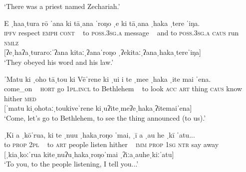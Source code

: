 \glt 
‘There was a priest named Zechariah.’ \textstyleExampleref{[R630-01.002]}
\z

\ea\label{ex:2.3}
\gll E ˌha{\ꞌ}aˌtura  rō ˈ{\ꞌ}ana {\textup{\textbar}} ki tāˌ{\ꞌ}ana ˈroŋo {\textup{\textbar}} ˌ{\ꞌ}e ki tāˌ{\ꞌ}ana ˌhaka ˌtere ˈiŋa.\\
\textsc{ipfv} respect \textsc{emph} \textsc{cont} ~  to \textsc{poss.3sg.a} message ~ and to \textsc{poss.3sg.a} \textsc{caus} run \textsc{nmlz}\\

[ʔeˌhaʔaˌturaroːˈʔana  kitaːˌʔanaˈroŋo  ˌʔekitaːˌʔanaˌhakaˌtereˈiŋa]\\

\glt 
‘They obeyed his word and his law.’ \textstyleExampleref{[R630-01.002]}
\z

\ea\label{ex:2.4}
\gll ˈMatu {\textup{\textbar}} ki ˌoho tāˌtou ki Vēˈrene {\textup{\textbar}} ki ˌu{\ꞌ}i i te ˌme{\ꞌ}e ˌhaka ˌ{\ꞌ}ite mai ˈena.\\
come\_on ~ \textsc{hort} go \textsc{1pl.incl} to Bethlehem ~ to look \textsc{acc} \textsc{art} thing \textsc{caus} know hither \textsc{med}\\

[ˈmatu  kiˌohotaːˌtoukiveˈrene kiˌuʔiteˌmeʔeˌhakaˌʔitemaiˈena]\\

\glt 
‘Come, let’s go to Bethlehem, to see the thing announced (to us).’ \textstyleExampleref{[R630-02.008]}
\z

\ea\label{ex:2.5}
\gll ˌKi a ˌkōˈrua, {\textup{\textbar}} ki te ˌnu{\ꞌ}u ˌhakaˌroŋo ˈmai, {\textup{\textbar}} ˌ{\ꞌ}ī a ˌau he ˌkī ˈatu...\\
to \textsc{prop} \textsc{2pl} ~ to \textsc{art} people listen hither ~ \textsc{imm} \textsc{prop} \textsc{1sg} \textsc{ntr} say away\\

[ˌkiaˌkoːˈrua  kiteˌnuʔuˌhakaˌroŋoˈmai  ˌʔiːaˌauheˌkiːˈatu]\\

\glt
‘To you, to the people listening, I tell you...’ \textstyleExampleref{[R630-04.063]}
\z


